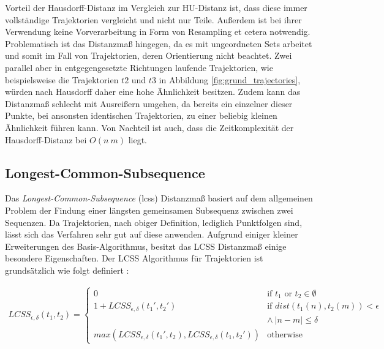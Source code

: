 Vorteil der Hausdorff-Distanz im Vergleich zur HU-Distanz ist, dass diese immer vollständige Trajektorien vergleicht
und nicht nur Teile. Außerdem ist bei ihrer Verwendung keine Vorverarbeitung in Form von Resampling et cetera notwendig.
Problematisch ist das Distanzmaß hingegen, da es mit ungeordneten Sets arbeitet und somit im Fall von Trajektorien, deren
Orientierung nicht beachtet. Zwei parallel aber in entgegengesetzte Richtungen laufende Trajektorien, wie beispielsweise
die Trajektorien $t2$ und $t3$ in Abbildung \ref{fig:grund_trajectories}, würden nach Hausdorff daher eine hohe Ähnlichkeit besitzen.
Zudem kann das Distanzmaß schlecht mit Ausreißern umgehen, da bereits ein einzelner dieser Punkte, bei ansonsten identischen
Trajektorien, zu einer beliebig kleinen Ähnlichkeit führen kann.
Von Nachteil ist auch, dass die Zeitkomplexität der Hausdorff-Distanz bei $O(n\ m)$ liegt.

\subsection{Longest-Common-Subsequence}
\label{sec:lcss_distance}

Das \textit{Longest-Common-Subsequence} (\acrshort*{lcss}) Distanzmaß basiert auf dem allgemeinen Problem der Findung
einer längsten gemeinsamen Subsequenz zwischen zwei Sequenzen. Da Trajektorien, nach obiger Definition, lediglich Punktfolgen sind,
lässt sich das Verfahren sehr gut auf diese anwenden. Aufgrund einiger kleiner Erweiterungen des Basis-Algorithmus, besitzt
das LCSS Distanzmaß einige besondere Eigenschaften. Der LCSS Algorithmus für Trajektorien ist grundsätzlich
wie folgt definiert \cite[]{Vlachos2002}:

\begin{ceqn}
\begin{align}
\label{eq_lcss}
    LCSS_{\epsilon, \delta}(t_1, t_2) =
    \begin{cases}
        0 & \text{if } t_1 \text{ or } t_2 \in \emptyset \\
        1 + LCSS_{\epsilon, \delta}(t_1', t_2') & \text{if } dist(t_1(n), t_2(m)) < \epsilon \\
        & \land\ |n - m| \leq \delta \\
        max(LCSS_{\epsilon, \delta}(t_1', t_2), LCSS_{\epsilon, \delta}(t_1, t_2')) & \text{otherwise}
    \end{cases}
\end{align}
\end{ceqn}

